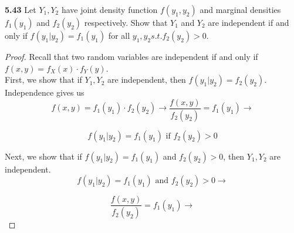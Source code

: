 \documentclass{exam}
\begin{document}
\begin{questions}




\newpage
\textbf{5.43 }
Let $Y_1, Y_2$ have joint density function $f(y_1, y_2)$ and marginal densities $f_1(y_1)$ and $f_2(y_2)$ respectively. Show that $Y_1$ and $Y_2$ are independent if and only if $f(y_1 | y_2) = f_1(y_1)$ for all $y_1, y_2 s.t. f_2(y_2) > 0$.
\begin{proof}
Recall that two random variables are independent if and only if $f(x, y) = f_X(x)\cdot f_Y(y)$. \\

First, we show that if $Y_1, Y_2$ are independent, then $f(y_1 | y_2) = f_2(y_2)$. Independence gives us
$$f(x, y) = f_1(y_1)\cdot f_2(y_2) \longrightarrow \frac{f(x, y)}{f_2(y_2)} = f_1(y_1)\longrightarrow$$

$$f(y_1 | y_2) = f_1(y_1) \text{ if } f_2(y_2) > 0$$

Next, we show that if $f(y_1 | y_2) = f_1(y_1)$ and $f_2(y_2) > 0$, then $Y_1,Y_2$ are independent.
$$f(y_1 | y_2) = f_1(y_1) \text{ and } f_2(y_2) > 0 \longrightarrow$$

$$\frac{f(x, y)}{f_2(y_2)} = f_1(y_1) \longrightarrow$$


\end{proof}
\end{questions}
\end{document}
